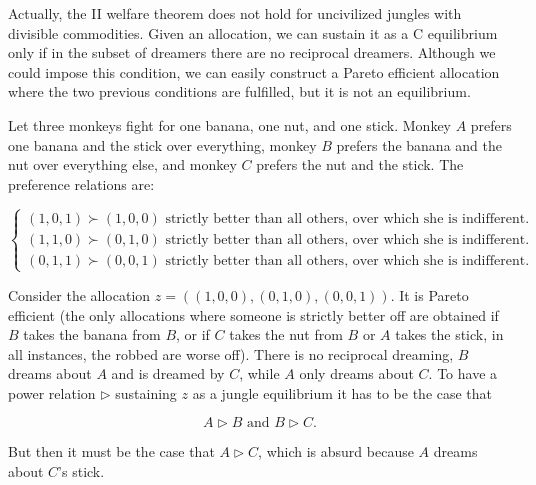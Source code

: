 Actually, the II welfare theorem does not hold for uncivilized jungles with divisible commodities. Given an allocation, we can sustain it as a C equilibrium only if in the subset of dreamers there are no reciprocal dreamers. Although we could impose this condition, we can easily construct a Pareto efficient allocation where the two previous conditions are fulfilled, but it is not an equilibrium.

\begin{example}
    Let three monkeys fight for one banana, one nut, and one stick. Monkey $A$ prefers one banana and the stick over everything, monkey $B$ prefers the banana and the nut over everything else, and monkey $C$ prefers the nut and the stick. The preference relations are:

    \[\begin{cases}
        (1,0,1)\succ (1,0,0) \text{ strictly better than all others, over which she is indifferent.} \\
        (1,1,0)\succ (0,1,0)  \text{ strictly better than all others, over which she is indifferent.} \\
        (0,1,1)\succ (0,0,1)  \text{ strictly better than all others, over which she is indifferent.}
    \end{cases}\]

    Consider the allocation $z=((1,0,0),(0,1,0),(0,0,1))$. It is Pareto efficient (the only allocations where someone is strictly better off are obtained if $B$ takes the banana from $B$, or if $C$ takes the nut from $B$ or $A$ takes the stick, in all instances, the robbed are worse off). There is no reciprocal dreaming, $B$ dreams about $A$ and is dreamed by $C$, while $A$ only dreams about $C$. To have a power relation $\triangleright$ sustaining $z$ as a jungle equilibrium it has to be the case that

    \[A\triangleright B\text{ and } B\triangleright C.\]

    But then it must be the case that $A\triangleright C$, which is absurd because $A$ dreams about $C$'s stick.
\end{example}

